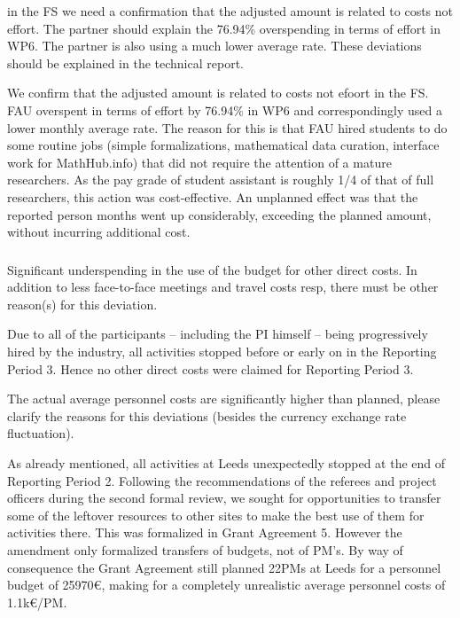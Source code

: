 \begin{EUcomment}
in the FS we need a confirmation that the adjusted amount is related to costs not effort. 
The partner should explain the 76.94\% overspending in terms of effort in WP6. The partner is
also using a much lower average rate. These deviations should be explained in the technical report.
\end{EUcomment}

We confirm that the adjusted amount is related to costs not efoort in the FS.
FAU overspent in terms of effort by 76.94\% in WP6 and correspondingly used a lower monthly
average rate. The reason for this is that FAU hired students to do some routine jobs
(simple formalizations, mathematical data curation, interface work for MathHub.info) that
did not require the attention of a mature researchers. As the pay grade of student
assistant is roughly 1/4 of that of full researchers, this action was cost-effective. An
unplanned effect was that the reported person months went up considerably, exceeding the
planned amount, without incurring additional cost.


\subsubsection{}
\begin{EUcomment}
  Significant underspending in the use of the budget for other direct
  costs. In addition to less face-to-face meetings and travel costs
  resp, there must be other reason(s) for this deviation.
\end{EUcomment}

Due to all of the  participants -- including the PI
himself -- being progressively hired by the industry, all activities
stopped before or early on in the Reporting Period 3. Hence no
other direct costs were claimed for Reporting Period 3.

\begin{EUcomment}
  The actual average personnel costs are significantly higher than
  planned, please clarify the reasons for this deviations (besides the
  currency exchange rate fluctuation).
\end{EUcomment}

As already mentioned, all activities at Leeds unexpectedly stopped at
the end of Reporting Period 2. Following the recommendations of the
referees and project officers during the second formal review, we
sought for opportunities to transfer some of the leftover resources to
other sites to make the best use of them for activities there. This was formalized in
Grant Agreement 5. However the amendment only formalized transfers of
budgets, not of PM's. By way of consequence the Grant Agreement still
planned 22PMs at Leeds for a personnel budget of 25970€, making for a
completely unrealistic average personnel costs of 1.1k€/PM.

